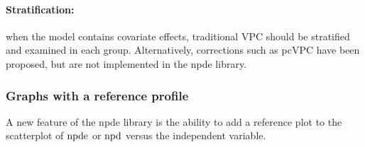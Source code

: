 \paragraph{Stratification:} when the model contains covariate effects, traditional VPC should be stratified and examined in each group. Alternatively, corrections such as pcVPC have been proposed, but are not implemented in the {\sf npde} library.

\subsubsection{Graphs with a reference profile}

\hskip 18pt A new feature of the {\sf npde} library is the ability to add a reference plot to the scatterplot of ${\rm npde}$ or ${\rm npd}$ versus the independent variable. 


